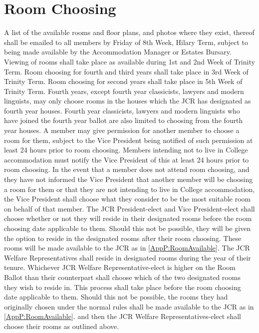 \section{Room Choosing}
\appnpara A list of the available rooms and floor plans, and photos where they exist, thereof shall be emailed to all members by Friday of 8th Week, Hilary Term, subject to being made available by the Accommodation Manager or Estates Bursary.
\appnpara Viewing of rooms shall take place as available during 1st and 2nd Week of Trinity Term.
\appnpara Room choosing for fourth and third years shall take place in 3rd Week of Trinity Term.
\appnpara Room choosing for second years shall take place in 5th Week of Trinity Term.
\appnpara Fourth years, except fourth year classicists, lawyers and modern linguists, may only choose rooms in the houses which the JCR has designated as fourth year houses. Fourth year classicists, lawyers and modern linguists who have joined the fourth year ballot are also limited to choosing from the fourth year houses.
\appnpara A member may give permission for another member to choose a room for them, subject to the Vice President being notified of such permission at least 24 hours prior to room choosing.
\appnpara Members intending not to live in College accommodation must notify the Vice President of this at least 24 hours prior to room choosing.
\appnpara In the event that a member does not attend room choosing, and they have not informed the Vice President that another member will be choosing a room for them or that they are not intending to live in College accommodation, the Vice President shall choose what they consider to be the most suitable room on behalf of that member.
\appnpara The JCR President-elect and Vice President-elect shall choose whether or not they will reside in their designated rooms before the room choosing date applicable to them. Should this not be possible, they will be given the option to reside in the designated rooms after their room choosing. These rooms will be made available to the JCR as in \ref{AppP:RoomAvailable}.
\appnpara The JCR Welfare Representatives shall reside in designated rooms during the year of their tenure. Whichever JCR Welfare Representative-elect is higher on the Room Ballot than their counterpart shall choose which of the two designated rooms they wish to reside in. This process shall take place before the room choosing date applicable to them. Should this not be possible, the rooms they had originally chosen under the normal rules shall be made available to the JCR as in \ref{AppP:RoomAvailable}. and then the JCR Welfare Representatives-elect shall choose their rooms as outlined above.
